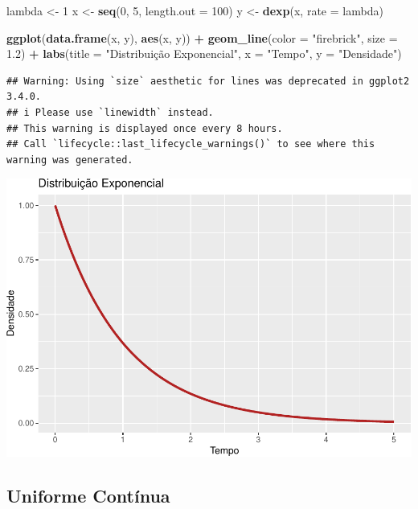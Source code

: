 \documentclass[
]{book}
\newenvironment{Shaded}{\begin{snugshade}}{\end{snugshade}}
\newcommand{\AttributeTok}[1]{\textcolor[rgb]{0.13,0.29,0.53}{#1}}
\newcommand{\DecValTok}[1]{\textcolor[rgb]{0.00,0.00,0.81}{#1}}
\newcommand{\FloatTok}[1]{\textcolor[rgb]{0.00,0.00,0.81}{#1}}
\newcommand{\FunctionTok}[1]{\textcolor[rgb]{0.13,0.29,0.53}{\textbf{#1}}}
\newcommand{\NormalTok}[1]{#1}
\newcommand{\OtherTok}[1]{\textcolor[rgb]{0.56,0.35,0.01}{#1}}
\newcommand{\SpecialCharTok}[1]{\textcolor[rgb]{0.81,0.36,0.00}{\textbf{#1}}}
\newcommand{\StringTok}[1]{\textcolor[rgb]{0.31,0.60,0.02}{#1}}
\begin{document}
\begin{Shaded}
\begin{Highlighting}[]
\NormalTok{lambda }\OtherTok{\textless{}{-}} \DecValTok{1}
\NormalTok{x }\OtherTok{\textless{}{-}} \FunctionTok{seq}\NormalTok{(}\DecValTok{0}\NormalTok{, }\DecValTok{5}\NormalTok{, }\AttributeTok{length.out =} \DecValTok{100}\NormalTok{)}
\NormalTok{y }\OtherTok{\textless{}{-}} \FunctionTok{dexp}\NormalTok{(x, }\AttributeTok{rate =}\NormalTok{ lambda)}

\FunctionTok{ggplot}\NormalTok{(}\FunctionTok{data.frame}\NormalTok{(x, y), }\FunctionTok{aes}\NormalTok{(x, y)) }\SpecialCharTok{+}
  \FunctionTok{geom\_line}\NormalTok{(}\AttributeTok{color =} \StringTok{"firebrick"}\NormalTok{, }\AttributeTok{size =} \FloatTok{1.2}\NormalTok{) }\SpecialCharTok{+}
  \FunctionTok{labs}\NormalTok{(}\AttributeTok{title =} \StringTok{"Distribuição Exponencial"}\NormalTok{, }\AttributeTok{x =} \StringTok{"Tempo"}\NormalTok{, }\AttributeTok{y =} \StringTok{"Densidade"}\NormalTok{)}
\end{Highlighting}
\end{Shaded}

\begin{verbatim}
## Warning: Using `size` aesthetic for lines was deprecated in ggplot2 3.4.0.
## i Please use `linewidth` instead.
## This warning is displayed once every 8 hours.
## Call `lifecycle::last_lifecycle_warnings()` to see where this warning was generated.
\end{verbatim}

\includegraphics{LivroEstatisticaR_files/figure-latex/exponencialDist-1.pdf}

\subsection{Uniforme Contínua}\label{uniforme-contuxednua}
\end{document}
